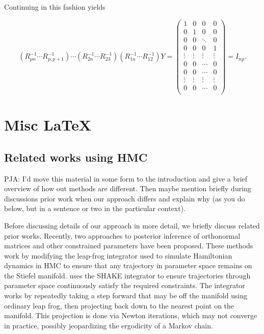 \documentclass{article}
\newcommand{\commentPJA}[1]{{\textcolor{commentPJA_color}{PJA: #1}}}
\begin{document}
Continuing in this fashion yields

\begin{equation}
(R_{pn}^{-1} \cdots R_{p,p+1}^{-1})
\cdots
(R_{2n}^{-1} \cdots R_{23}^{-1})
(R_{1n}^{-1} \cdots R_{12}^{-1}) Y 
=
\begin{pmatrix}
1 & 0 & 0 & 0\\
0 & 1 & 0 & 0\\
0 & 0 & \ddots & 0\\
0 & 0 & 0 & 1\\
\vdots & \vdots & \vdots & \vdots\\
0 & 0 & \cdots & 0\\
0 & 0 & \cdots & 0\\
\vdots & \vdots & \vdots & \vdots\\
0 & 0 & \cdots & 0\\
\end{pmatrix}
=
I_{np}.
\end{equation}

\section{Misc LaTeX}

\subsection{Related works using HMC}
\commentPJA{I'd move this material in some form to the introduction and give a brief overview of how out methods are different.  Then maybe mention briefly during discussions prior work when our approach differs and explain why (as you do below, but in a sentence or two in the particular context).}

Before discussing details of our approach in more detail, we briefly discuss related prior works.  Recently, two approaches to posterior inference of orthonormal matrices and other constrained parameters have been proposed. These methods work by modifying the leap-frog integrator used to simulate Hamiltonian dynamics in HMC to ensure that any trajectory in parameter space remains on the Stiefel manifold. \citet{brubaker2012family} uses the SHAKE integrator \citep{leimkuhler2004simulating} to ensure trajectories through parameter space continuously satisfy the required constraints. The integrator works by repeatedly taking a step forward that may be off the manifold using ordinary leap frog, then projecting back down to the nearest point on the manifold. This projection is done via Newton iterations, which may not converge in practice, possibly jeopardizing the ergodicity of a Markov chain.
\end{document}
